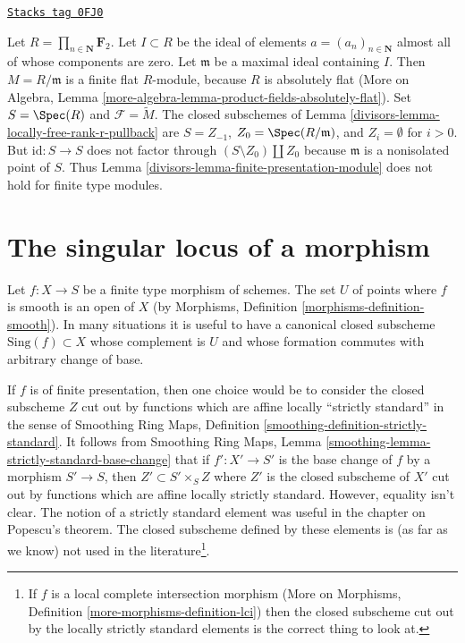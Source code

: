 \begin{example}[Not fp MB]
\label{divisors-example-not-fp-MB}
\href{https://stacks.math.columbia.edu/tag/0FJ0}{\texttt{Stacks tag 0FJ0}}

Let $R = \prod_{n \in \mathbf{N}} \mathbf{F}_2$. Let $I \subset R$
be the ideal of elements $a = (a_n)_{n \in \mathbf{N}}$ almost all of whose
components are zero. Let $\mathfrak m$ be a maximal ideal containing $I$.
Then $M = R/\mathfrak m$ is a finite flat $R$-module, because $R$ is absolutely
flat (More on Algebra, Lemma
\ref{more-algebra-lemma-product-fields-absolutely-flat}).
Set $S = \Spec(R)$ and $\mathcal{F} = \widetilde{M}$.
The closed subschemes of Lemma \ref{divisors-lemma-locally-free-rank-r-pullback} are
$S = Z_{-1}$, $Z_0 = \Spec(R/\mathfrak m)$, and $Z_i = \emptyset$ for $i > 0$.
But $\text{id} : S \to S$ does not factor through
$(S \setminus Z_0) \amalg Z_0$ because $\mathfrak m$ is a nonisolated
point of $S$. Thus
Lemma \ref{divisors-lemma-finite-presentation-module}
does not hold for finite type modules.
\end{example}

\section{The singular locus of a morphism}
\label{divisors-section-singular-locus-morphism}
Let $f : X \to S$ be a finite type morphism of schemes. The set $U$ of points
where $f$ is smooth is an open of $X$
(by Morphisms, Definition \ref{morphisms-definition-smooth}).
In many situations it is useful to have a canonical closed
subscheme $\text{Sing}(f) \subset X$ whose complement is $U$
and whose formation commutes with arbitrary change of base.

\medskip\noindent
If $f$ is of finite presentation, then one choice would be to consider the
closed subscheme $Z$ cut out by functions which are affine locally
``strictly standard'' in the sense of
Smoothing Ring Maps, Definition \ref{smoothing-definition-strictly-standard}.
It follows from
Smoothing Ring Maps, Lemma \ref{smoothing-lemma-strictly-standard-base-change}
that if $f' : X' \to S'$ is the base change of $f$ by a morphism
$S' \to S$, then $Z' \subset S' \times_S Z$ where $Z'$ is the
closed subscheme of $X'$ cut out by functions which are affine
locally strictly standard. However, equality isn't clear.
The notion of a strictly standard element was useful in the chapter on
Popescu's theorem. The closed subscheme defined by these elements is
(as far as we know) not used in the literature\footnote{If $f$ is a
local complete intersection morphism
(More on Morphisms, Definition \ref{more-morphisms-definition-lci})
then the closed subscheme cut out by the locally strictly standard
elements is the correct thing to look at.}.

